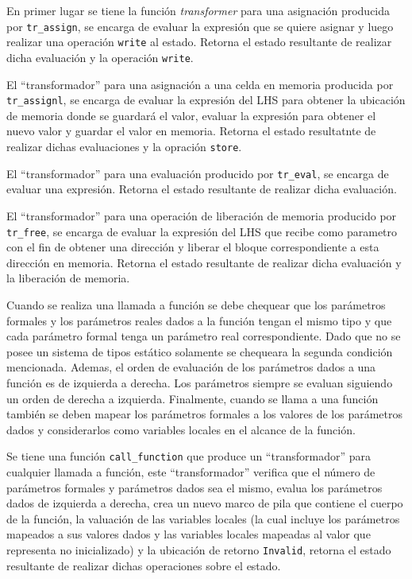 En primer lugar se tiene la función \textit{transformer} para una asignación producida por \verb|tr_assign|, se encarga de evaluar la expresión que se quiere asignar y luego realizar una operación \verb|write| al estado.
Retorna el estado resultante de realizar dicha evaluación y la operación \verb|write|.

El ``transformador'' para una asignación a una celda en memoria producida por \verb|tr_assignl|, se encarga de evaluar la expresión del LHS para obtener la ubicación de memoria donde se guardará el valor, evaluar la expresión para obtener el nuevo valor y guardar el valor en memoria.
Retorna el estado resultatnte de realizar dichas evaluaciones y la opración \verb|store|.

El ``transformador'' para una evaluación producido por \verb|tr_eval|, se encarga de evaluar una expresión.
Retorna el estado resultante de realizar dicha evaluación.

El ``transformador'' para una operación de liberación de memoria producido por \verb|tr_free|, se encarga de evaluar la expresión del LHS que recibe como parametro con el fin de obtener una dirección y liberar el bloque correspondiente a esta dirección en memoria.
Retorna el estado resultante de realizar dicha evaluación y la liberación de memoria.

Cuando se realiza una llamada a función se debe chequear que los parámetros formales y los parámetros reales dados a la función tengan el mismo tipo y que cada parámetro formal tenga un parámetro real correspondiente.
Dado que no se posee un sistema de tipos estático solamente se chequeara la segunda condición mencionada.
Ademas, el orden de evaluación de los parámetros dados a una función es de izquierda a derecha.
Los parámetros siempre se evaluan siguiendo un orden de derecha a izquierda.
Finalmente, cuando se llama a una función también se deben mapear los parámetros formales a los valores de los parámetros dados y considerarlos como variables locales en el alcance de la función.

Se tiene una función \verb|call_function| que produce un ``transformador'' para cualquier llamada a función, este ``transformador'' verifica que el número de parámetros formales y parámetros dados sea el mismo, evalua los parámetros dados de izquierda a derecha, crea un nuevo marco de pila que contiene el cuerpo de la función, la valuación de las variables locales (la cual incluye los parámetros mapeados a sus valores dados y las variables locales mapeadas al valor que representa no inicializado) y la ubicación de retorno \verb|Invalid|, retorna el estado resultante de realizar dichas operaciones sobre el estado.

